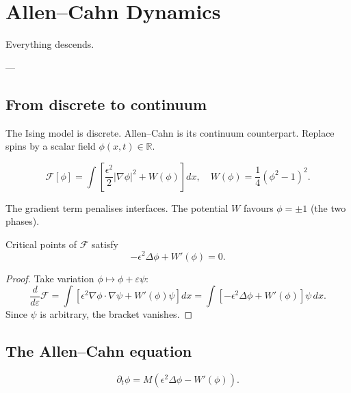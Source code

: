 
\chapter{Allen--Cahn Dynamics}
\label{ch:allen-cahn}

\epigraph{%
  Everything descends.%
}{---}

\section{From discrete to continuum}

The Ising model is discrete.
Allen--Cahn is its continuum counterpart.
Replace spins by a scalar field $\phi(x,t) \in \mathbb{R}$.

\begin{definition}
  \[
    \mathcal{F}[\phi]
    = \int \left[\frac{\epsilon^2}{2}|\nabla\phi|^2 + W(\phi)\right]dx,
    \quad W(\phi) = \frac{1}{4}(\phi^2-1)^2.
  \]
\end{definition}

The gradient term penalises interfaces.
The potential $W$ favours $\phi = \pm 1$ (the two phases).

\begin{proposition}
  Critical points of $\mathcal{F}$ satisfy
  \[
    -\epsilon^2\Delta\phi + W'(\phi) = 0.
  \]
\end{proposition}

\begin{proof}
  Take variation $\phi \mapsto \phi + \varepsilon\psi$:
  \[
    \frac{d}{d\varepsilon}\mathcal{F}
    = \int\left[\epsilon^2\nabla\phi\cdot\nabla\psi
      + W'(\phi)\psi\right]dx
    = \int\left[-\epsilon^2\Delta\phi + W'(\phi)\right]\psi\,dx.
  \]
  Since $\psi$ is arbitrary, the bracket vanishes.
\end{proof}

\section{The Allen--Cahn equation}

\begin{definition}
  \[
    \boxed{\partial_t\phi = M(\epsilon^2\Delta\phi - W'(\phi)).}
  \]
\end{definition}

